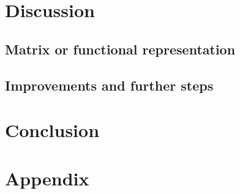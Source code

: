 \documentclass[bibliography=totocnumbered]{article}
\theoremstyle{NoticeStyle}
\begin{document}
%
\section{Discussion}\label{sec:Discussion}

\subsection{Matrix or functional representation}

\subsection{Improvements and further steps}

%
\section{Conclusion}


%
\section{Appendix}
%

\newpage

{}

\nocite{Perry2012}
\nocite{BasicConceptsQC}

\label{sec:References}


\end{document}
